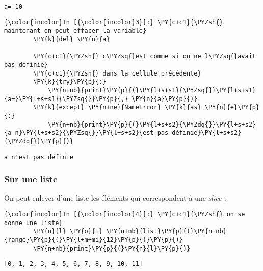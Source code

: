     \begin{Verbatim}[commandchars=\\\{\}]
a= 10

    \end{Verbatim}

    \begin{Verbatim}[commandchars=\\\{\}]
{\color{incolor}In [{\color{incolor}3}]:} \PY{c+c1}{\PYZsh{} maintenant on peut effacer la variable}
        \PY{k}{del} \PY{n}{a}
        
        \PY{c+c1}{\PYZsh{} c\PYZsq{}est comme si on ne l\PYZsq{}avait pas définie}
        \PY{c+c1}{\PYZsh{} dans la cellule précédente}
        \PY{k}{try}\PY{p}{:}
            \PY{n+nb}{print}\PY{p}{(}\PY{l+s+s1}{\PYZsq{}}\PY{l+s+s1}{a=}\PY{l+s+s1}{\PYZsq{}}\PY{p}{,} \PY{n}{a}\PY{p}{)}
        \PY{k}{except} \PY{n+ne}{NameError} \PY{k}{as} \PY{n}{e}\PY{p}{:}
            \PY{n+nb}{print}\PY{p}{(}\PY{l+s+s2}{\PYZdq{}}\PY{l+s+s2}{a n}\PY{l+s+s2}{\PYZsq{}}\PY{l+s+s2}{est pas définie}\PY{l+s+s2}{\PYZdq{}}\PY{p}{)}
\end{Verbatim}


    \begin{Verbatim}[commandchars=\\\{\}]
a n'est pas définie

    \end{Verbatim}

    \hypertarget{sur-une-liste}{%
\subsubsection{Sur une liste}\label{sur-une-liste}}

    On peut enlever d'une liste les éléments qui correspondent à une
\emph{slice}~:

    \begin{Verbatim}[commandchars=\\\{\}]
{\color{incolor}In [{\color{incolor}4}]:} \PY{c+c1}{\PYZsh{} on se donne une liste}
        \PY{n}{l} \PY{o}{=} \PY{n+nb}{list}\PY{p}{(}\PY{n+nb}{range}\PY{p}{(}\PY{l+m+mi}{12}\PY{p}{)}\PY{p}{)}
        \PY{n+nb}{print}\PY{p}{(}\PY{n}{l}\PY{p}{)}
\end{Verbatim}


    \begin{Verbatim}[commandchars=\\\{\}]
[0, 1, 2, 3, 4, 5, 6, 7, 8, 9, 10, 11]

    \end{Verbatim}

